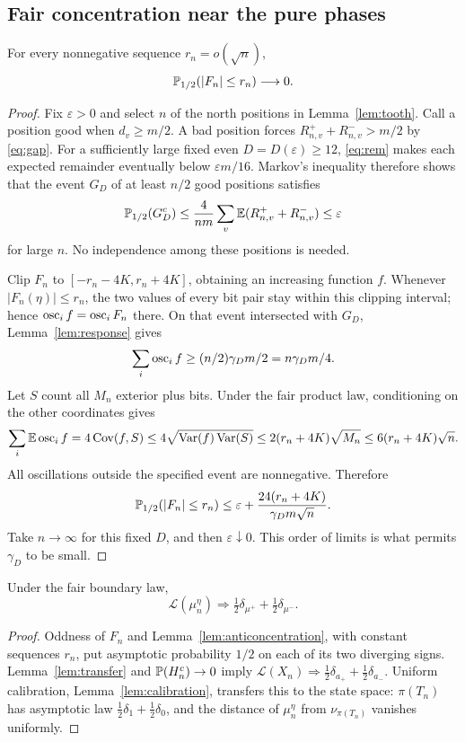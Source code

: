\subsection{Fair concentration near the pure phases}
\begin{lemma}\label{lem:anticoncentration}
For every nonnegative sequence $r_n=o(\sqrt n)$,
\[
 \mathbb P_{1/2}(|F_n|\le r_n)\longrightarrow0.
\]
\end{lemma}
\begin{proof}
Fix $\varepsilon>0$ and select $n$ of the north positions in Lemma~\ref{lem:tooth}. Call a position good when $d_v\ge m/2$. A bad position forces $R_{n,v}^++R_{n,v}^->m/2$ by \eqref{eq:gap}. For a sufficiently large fixed even $D=D(\varepsilon)\ge12$, \eqref{eq:rem} makes each expected remainder eventually below $\varepsilon m/16$. Markov's inequality therefore shows that the event $G_D$ of at least $n/2$ good positions satisfies
\[
 \mathbb P_{1/2}(G_D^c)\le
 \frac4{nm}\sum_v\mathbb E(R_{n,v}^++R_{n,v}^-)\le\varepsilon
\]
for large $n$. No independence among these positions is needed.

Clip $F_n$ to $[-r_n-4K,r_n+4K]$, obtaining an increasing function $f$. Whenever $|F_n(\eta)|\le r_n$, the two values of every bit pair stay within this clipping interval; hence $\operatorname{osc}_i f=\operatorname{osc}_i F_n$ there. On that event intersected with $G_D$, Lemma~\ref{lem:response} gives
\[
 \sum_i\operatorname{osc}_i f\ge(n/2)\gamma_Dm/2=n\gamma_Dm/4.
\]
Let $S$ count all $M_n$ exterior plus bits. Under the fair product law, conditioning on the other coordinates gives
\[
 \sum_i\mathbb E\operatorname{osc}_i f=4\operatorname{Cov}(f,S)
 \le4\sqrt{\operatorname{Var}(f)\operatorname{Var}(S)}
 \le2(r_n+4K)\sqrt{M_n}\le6(r_n+4K)\sqrt n.
\]
All oscillations outside the specified event are nonnegative. Therefore
\[
 \mathbb P_{1/2}(|F_n|\le r_n)
 \le\varepsilon+\frac{24(r_n+4K)}{\gamma_Dm\sqrt n}.
\]
Take $n\to\infty$ for this fixed $D$, and then $\varepsilon\downarrow0$. This order of limits is what permits $\gamma_D$ to be small.
\end{proof}

\begin{lemma}\label{lem:law}
Under the fair boundary law,
\[
 \mathcal L(\mu_n^\eta)\Rightarrow
 \tfrac12\delta_{\mu^+}+\tfrac12\delta_{\mu^-}.
\]
\end{lemma}
\begin{proof}
Oddness of $F_n$ and Lemma~\ref{lem:anticoncentration}, with constant sequences $r_n$, put asymptotic probability $1/2$ on each of its two diverging signs. Lemma~\ref{lem:transfer} and $\mathbb P(H_n^c)\to0$ imply
$\mathcal L(X_n)\Rightarrow\tfrac12\delta_{a_+}+\tfrac12\delta_{a_-}$.
Uniform calibration, Lemma~\ref{lem:calibration}, transfers this to the state space: $\pi(T_n)$ has asymptotic law $\tfrac12\delta_1+\tfrac12\delta_0$, and the distance of $\mu_n^\eta$ from $\nu_{\pi(T_n)}$ vanishes uniformly.
\end{proof}

